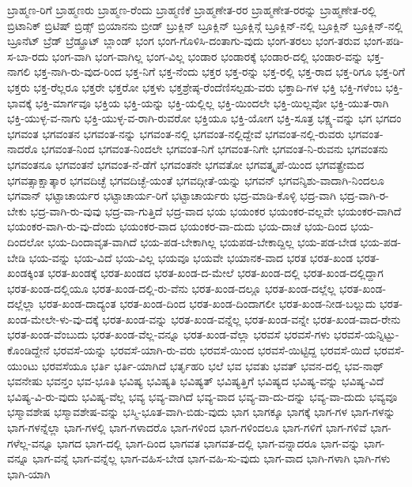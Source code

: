 {ಬ್ರಾಹ್ಮಣ-ರಿಗೆ
ಬ್ರಾಹ್ಮಣರು
ಬ್ರಾಹ್ಮಣ-ರೆಂದು
ಬ್ರಾಹ್ಮಣಿಕೆ
ಬ್ರಾಹ್ಮಣೇತ-ರರ
ಬ್ರಾಹ್ಮಣೇತ-ರರನ್ನು
ಬ್ರಾಹ್ಮಣೇತ-ರಲ್ಲಿ
ಬ್ರಿಟಾನಿಕ್
ಬ್ರಿಟಿಷ್
ಬ್ರಿಡ್ಸ್
ಬ್ರಿಯಾನನು
ಬ್ರೀಡ್
ಬ್ರುಕ್ಲಿನ್
ಬ್ರೂಕ್ಲಿನ್
ಬ್ರೂಕ್ಲಿನ್ಗೆ
ಬ್ರೂಕ್ಲಿನ್-ನಲ್ಲಿ
ಬ್ರೂಕ್ಲಿನ್
ಬ್ರೂಕ್ಲಿನ್-ನಲ್ಲಿ
ಬ್ರೂನೆಟ್
ಬ್ರೆಡ್
ಬ್ರೆಡ್ಫ್ರೂಟ್
ಬ್ಲಾಂಡ್
ಭಂಗ
ಭಂಗ-ಗೊಳಿಸಿ-ದಂತಾಗು-ವುದು
ಭಂಗ-ತರಲು
ಭಂಗ-ತರುವ
ಭಂಗ-ಪಡಿ-ಸ-ಬಾ-ರದು
ಭಂಗ-ವಾಗಿ
ಭಂಗ-ವಾಗಿಲ್ಲ
ಭಂಗ-ವಿಲ್ಲ
ಭಂಡಾರ
ಭಂಡಾರಕ್ಕೆ
ಭಂಡಾರ-ದಲ್ಲಿ
ಭಂಡಾರ-ವನ್ನು
ಭಕ್ತ-ನಾಗಲಿ
ಭಕ್ತ-ನಾಗಿ-ರು-ವುದ-ರಿಂದ
ಭಕ್ತ-ನಿಗೆ
ಭಕ್ತ-ನೆಂದು
ಭಕ್ತರ
ಭಕ್ತ-ರನ್ನು
ಭಕ್ತ-ರಲ್ಲಿ
ಭಕ್ತ-ರಾದ
ಭಕ್ತ-ರಿಗೂ
ಭಕ್ತ-ರಿಗೆ
ಭಕ್ತರು
ಭಕ್ತ-ರೆಲ್ಲರೂ
ಭಕ್ತರೇ
ಭಕ್ತರೋ
ಭಕ್ತಳು
ಭಕ್ತಶ್ರೇಷ್ಠ-ರೆಂದೆಣಿಸಲ್ಪಡು-ವರು
ಭಕ್ತಾದಿ-ಗಳ
ಭಕ್ತಿ
ಭಕ್ತಿ-ಗಳೆಂಬ
ಭಕ್ತಿ-ಭಾವಕ್ಕೆ
ಭಕ್ತಿ-ಮಾರ್ಗವೂ
ಭಕ್ತಿಯ
ಭಕ್ತಿ-ಯನ್ನು
ಭಕ್ತಿ-ಯಲ್ಲಿಲ್ಲ
ಭಕ್ತಿ-ಯಿಂದಲೇ
ಭಕ್ತಿ-ಯಿಲ್ಲವೋ
ಭಕ್ತಿ-ಯುತ-ರಾಗಿ
ಭಕ್ತಿ-ಯುಳ್ಳ-ವ-ನಾಗು
ಭಕ್ತಿ-ಯುಳ್ಳ-ವ-ರಾಗಿ-ರುವರೋ
ಭಕ್ತಿಯೂ
ಭಕ್ತಿ-ಯೋಗ
ಭಕ್ತಿ-ಸೂತ್ರ
ಭಕ್ಷ್ಯ-ವನ್ನು
ಭಗ
ಭಗದಂ
ಭಗವಂತ
ಭಗವಂತನ
ಭಗವಂತ-ನನ್ನು
ಭಗವಂತ-ನಲ್ಲಿ
ಭಗವಂತ-ನಲ್ಲಿದ್ದೇವೆ
ಭಗವಂತ-ನಲ್ಲಿ-ರುವರು
ಭಗವಂತ-ನಾದರೊ
ಭಗವಂತ-ನಿಂದ
ಭಗವಂತ-ನಿಂದಲೇ
ಭಗವಂತ-ನಿಗೆ
ಭಗವಂತ-ನಿಗೇ
ಭಗವಂತ-ನಿ-ರುವನು
ಭಗವಂತನು
ಭಗವಂತನೂ
ಭಗವಂತನೆ
ಭಗವಂತ-ನೆ-ಡೆಗೆ
ಭಗವಂತನೇ
ಭಗವತೋ
ಭಗವತ್ಕೃಪೆ-ಯಿಂದ
ಭಗವತ್ಪ್ರೇಮದ
ಭಗವತ್ಸಾಕ್ಷಾತ್ಕಾರ
ಭಗವದಿಚ್ಛೆ
ಭಗವದಿಚ್ಛೆ-ಯಂತೆ
ಭಗವದ್ಗೀತೆ-ಯನ್ನು
ಭಗವನ್
ಭಗವನ್ಶಿಶು-ವಾದಾಗಿ-ನಿಂದಲೂ
ಭಗವಾನ್
ಭಟ್ಟಾಚಾರ್ಯರ
ಭಟ್ಟಾಚಾರ್ಯ-ರಿಗೆ
ಭಟ್ಟಾಚಾರ್ಯರು
ಭದ್ರ-ಮಾಡಿ-ಕೊಳ್ಳಿ
ಭದ್ರ-ವಾಗಿ
ಭದ್ರ-ವಾಗಿ-ರ-ಬೇಕು
ಭದ್ರ-ವಾಗಿ-ರು-ವುವು
ಭದ್ರ-ವಾ-ಗುತ್ತಿದೆ
ಭದ್ರ-ವಾದ
ಭಯ
ಭಯಂಕರ
ಭಯಂಕರ-ವಲ್ಲವೇ
ಭಯಂಕರ-ವಾಗಿದೆ
ಭಯಂಕರ-ವಾಗಿ-ರು-ವು-ದೆಂದು
ಭಯಂಕರ-ವಾದ
ಭಯಂಕರ-ವಾ-ದುದು
ಭಯ-ದಾಚೆ
ಭಯ-ದಿಂದ
ಭಯ-ದಿಂದಲೋ
ಭಯ-ದಿಂದಾವೃತ-ವಾಗಿದೆ
ಭಯ-ಪಡ-ಬೇಕಾಗಿಲ್ಲ
ಭಯಪಡ-ಬೇಕಾದ್ದಿಲ್ಲ
ಭಯ-ಪಡ-ಬೇಡ
ಭಯ-ಪಡ-ಬೇಡಿ
ಭಯ-ವನ್ನು
ಭಯ-ವಿದೆ
ಭಯ-ವಿಲ್ಲ
ಭಯವೂ
ಭಯವೇ
ಭಯಾನಕ-ವಾದ
ಭರತ
ಭರತ-ಖಂಡ
ಭರತ-ಖಂಡಕ್ಕಿಂತ
ಭರತ-ಖಂಡಕ್ಕೆ
ಭರತ-ಖಂಡದ
ಭರತ-ಖಂಡ-ದ-ಮೇಲೆ
ಭರತ-ಖಂಡ-ದಲ್ಲಿ
ಭರತ-ಖಂಡ-ದಲ್ಲಿದ್ದಾಗ
ಭರತ-ಖಂಡ-ದಲ್ಲಿಯೂ
ಭರತ-ಖಂಡ-ದಲ್ಲಿ-ರು-ವೆನು
ಭರತ-ಖಂಡ-ದಲ್ಲೂ
ಭರತ-ಖಂಡ-ದಲ್ಲೆಲ್ಲ
ಭರತ-ಖಂಡ-ದಲ್ಲೆಲ್ಲಾ
ಭರತ-ಖಂಡ-ದಾದ್ಯಂತ
ಭರತ-ಖಂಡ-ದಿಂದ
ಭರತ-ಖಂಡ-ದಿಂದಾಗಲೀ
ಭರತ-ಖಂಡ-ನೀಡ-ಬಲ್ಲುದು
ಭರತ-ಖಂಡ-ಮೇಲೇ-ಳು-ವು-ದಕ್ಕೆ
ಭರತ-ಖಂಡ-ವನ್ನು
ಭರತ-ಖಂಡ-ವನ್ನೆಲ್ಲ
ಭರತ-ಖಂಡ-ವನ್ನೇ
ಭರತ-ಖಂಡ-ವಾದ-ರೇನು
ಭರತ-ಖಂಡ-ವೆಂಬುದು
ಭರತ-ಖಂಡ-ವೆಲ್ಲ-ವನ್ನೂ
ಭರತ-ಖಂಡ-ವೆಲ್ಲಾ
ಭರವಸೆ
ಭರವಸೆ-ಗಳು
ಭರವಸೆ-ಯನ್ನಿಟ್ಟು-ಕೊಂಡಿದ್ದೇನೆ
ಭರವಸೆ-ಯನ್ನು
ಭರವಸೆ-ಯಾಗಿ-ರು-ವರು
ಭರವಸೆ-ಯಿಂದ
ಭರವಸೆ-ಯಿಟ್ಟಿದ್ದ
ಭರವಸೆ-ಯಿದೆ
ಭರವಸೆ-ಯುಂಟು
ಭರವಸೆಯೂ
ಭರ್ತಿ
ಭರ್ತಿ-ಯಾಗಿದೆ
ಭರ್ತೃಹರಿ
ಭಲೆ
ಭವ
ಭವತು
ಭವತ್
ಭವನ-ದಲ್ಲಿ
ಭವ-ನಾಥ್
ಭವನೇಷು
ಭವನ್ತಂ
ಭವ-ಭೂತಿ
ಭವಿಷ್ಯ
ಭವಿಷ್ಯತಿ
ಭವಿಷ್ಯತ್
ಭವಿಷ್ಯತ್ತಿಗೆ
ಭವಿಷ್ಯದ
ಭವಿಷ್ಯ-ವನ್ನು
ಭವಿಷ್ಯ-ವಿದೆ
ಭವಿಷ್ಯ-ವಿ-ರು-ವುದು
ಭವಿಷ್ಯ-ವೆಲ್ಲ
ಭವ್ಯ
ಭವ್ಯ-ವಾಗಿದೆ
ಭವ್ಯ-ವಾದ
ಭವ್ಯ-ವಾ-ದು-ದನ್ನು
ಭವ್ಯ-ವಾ-ದುದು
ಭವ್ಯವೂ
ಭಸ್ಮಾವಶೇಷ
ಭಸ್ಮಾವಶೇಷ-ವನ್ನು
ಭಸ್ಮಿ-ಭೂತ-ವಾಗಿ-ಬಿಡು-ವುದು
ಭಾಗ
ಭಾಗಕ್ಕೂ
ಭಾಗಕ್ಕೆ
ಭಾಗ-ಗಳ
ಭಾಗ-ಗಳನ್ನು
ಭಾಗ-ಗಳನ್ನೆಲ್ಲಾ
ಭಾಗ-ಗಳಲ್ಲಿ
ಭಾಗ-ಗಳಾದರೊ
ಭಾಗ-ಗಳಿಂದ
ಭಾಗ-ಗಳಿಂದಲೂ
ಭಾಗ-ಗಳಿಗೆ
ಭಾಗ-ಗಳಿವೆ
ಭಾಗ-ಗಳೆಲ್ಲ-ವನ್ನೂ
ಭಾಗದ
ಭಾಗ-ದಲ್ಲಿ
ಭಾಗ-ದಿಂದ
ಭಾಗವತ
ಭಾಗವತ-ದಲ್ಲಿ
ಭಾಗ-ವನ್ನಾದರೂ
ಭಾಗ-ವನ್ನು
ಭಾಗ-ವನ್ನೂ
ಭಾಗ-ವನ್ನೆ
ಭಾಗ-ವನ್ನೆಲ್ಲ
ಭಾಗ-ವಹಿಸ-ಬೇಡ
ಭಾಗ-ವಹಿ-ಸು-ವುದು
ಭಾಗ-ವಾದ
ಭಾಗಿ-ಗಳಾಗಿ
ಭಾಗಿ-ಗಳು
ಭಾಗಿ-ಯಾಗಿ
}
